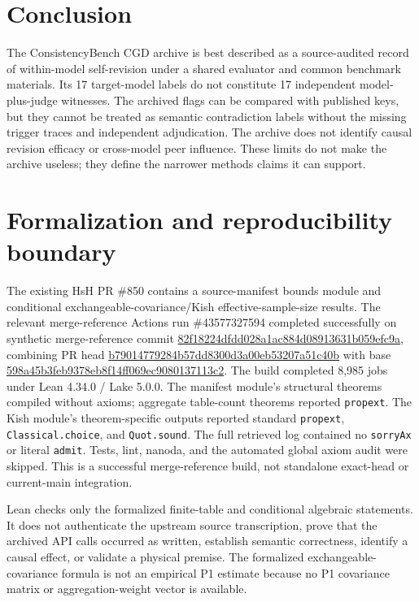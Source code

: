 \documentclass[11pt]{article}
\begin{document}
\section{Conclusion}
The ConsistencyBench CGD archive is best described as a source-audited record of within-model self-revision under a shared evaluator and common benchmark materials. Its 17 target-model labels do not constitute 17 independent model-plus-judge witnesses. The archived flags can be compared with published keys, but they cannot be treated as semantic contradiction labels without the missing trigger traces and independent adjudication. The archive does not identify causal revision efficacy or cross-model peer influence. These limits do not make the archive useless; they define the narrower methods claims it can support.

\appendix
\section{Formalization and reproducibility boundary}
The existing HsH PR \#850 contains a source-manifest bounds module and conditional exchangeable-covariance/Kish effective-sample-size results. The relevant merge-reference Actions run \#43577327594 completed successfully on synthetic merge-reference commit \url{82f18224dfdd028a1ac884d08913631b059efc9a}, combining PR head \url{b79014779284b57dd8300d3a00eb53207a51c40b} with base \url{598a45b3feb9378eb8f14ff069ec9080137113c2}. The build completed 8,985 jobs under Lean 4.34.0 / Lake 5.0.0. The manifest module's structural theorems compiled without axioms; aggregate table-count theorems reported \texttt{propext}. The Kish module's theorem-specific outputs reported standard \texttt{propext}, \texttt{Classical.choice}, and \texttt{Quot.sound}. The full retrieved log contained no \texttt{sorryAx} or literal \texttt{admit}. Tests, lint, nanoda, and the automated global axiom audit were skipped. This is a successful merge-reference build, not standalone exact-head or current-main integration.

Lean checks only the formalized finite-table and conditional algebraic statements. It does not authenticate the upstream source transcription, prove that the archived API calls occurred as written, establish semantic correctness, identify a causal effect, or validate a physical premise. The formalized exchangeable-covariance formula is not an empirical P1 estimate because no P1 covariance matrix or aggregation-weight vector is available.
\end{document}
